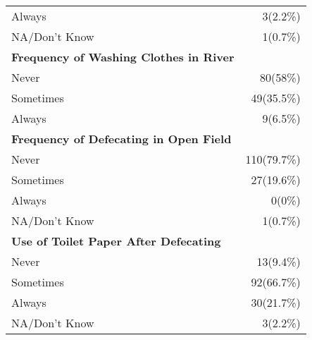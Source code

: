 \documentclass[4pt,letterpaper]{article}
\begin{document}
\begin{multicols}{2}
\begin{center}
\begin{tabular}{p{5cm}r}
Always & 3(2.2\%) \\
NA/Don't Know & 1(0.7\%) \\
\midrule
\textbf{Frequency of Washing Clothes in River} & \\
Never & 80(58\%) \\
Sometimes & 49(35.5\%) \\
Always & 9(6.5\%) \\
\midrule
\textbf{Frequency of Defecating in Open Field} & \\
Never & 110(79.7\%) \\
Sometimes & 27(19.6\%) \\
Always & 0(0\%) \\
NA/Don't Know & 1(0.7\%) \\
\midrule
\textbf{Use of Toilet Paper After Defecating} & \\
Never & 13(9.4\%) \\
Sometimes & 92(66.7\%) \\
Always & 30(21.7\%) \\
NA/Don't Know & 3(2.2\%) \\
\bottomrule
\end{tabular}
\end{center}


\end{multicols}
\end{document}

